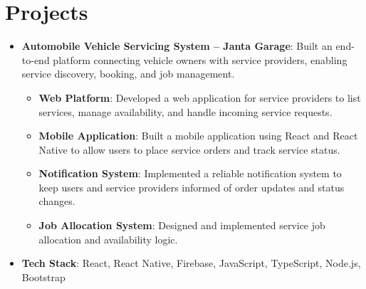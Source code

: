 \documentclass[letterpaper,11pt]{article}
\newcommand{\resumeItem}[2]{
  \item\small{
    \textbf{#1}{: #2 \vspace{-2pt}}
  }
}
\newcommand{\resumeSubItem}[2]{\resumeItem{#1}{#2}\vspace{-4pt}}
\newcommand{\resumeSubHeadingListStart}{\begin{itemize}[leftmargin=*]}
\newcommand{\resumeSubHeadingListEnd}{\end{itemize}}
\newcommand{\resumeItemListStart}{\begin{itemize}}
\newcommand{\resumeItemListEnd}{\end{itemize}\vspace{-5pt}}
\begin{document}
\section{Projects}
  \resumeSubHeadingListStart

    \resumeSubItem{Automobile Vehicle Servicing System -- Janta Garage}
      {Built an end-to-end platform connecting vehicle owners with service providers, enabling service discovery, booking, and job management.}

      \resumeItemListStart
        \resumeItem{Web Platform}
          {Developed a web application for service providers to list services, manage availability, and handle incoming service requests.}

        \resumeItem{Mobile Application}
          {Built a mobile application using React and React Native to allow users to place service orders and track service status.}

        \resumeItem{Notification System}
          {Implemented a reliable notification system to keep users and service providers informed of order updates and status changes.}

        \resumeItem{Job Allocation System}
          {Designed and implemented service job allocation and availability logic.}
      \resumeItemListEnd

      \resumeSubItem{Tech Stack}
        {React, React Native, Firebase, JavaScript, TypeScript, Node.js, Bootstrap}

  \resumeSubHeadingListEnd
\end{document}
